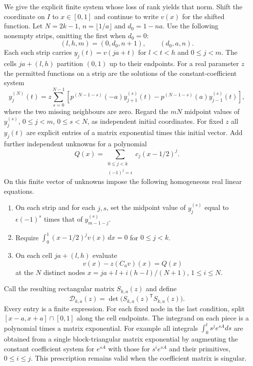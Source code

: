 \documentclass[11pt,a4paper]{article}
\numberwithin{equation}{section}
\begin{document}
We give the explicit finite system whose loss of rank yields that norm. Shift the coordinate on $I$ to $x\in[0,1]$ and continue to write $v(x)$ for the shifted function. Let $N=2k-1$, $n=\lfloor 1/a\rfloor$ and $d_0=1-na$. Use the following nonempty strips, omitting the first when $d_0=0$:
\[
 (l,h,m)=(0,d_0,n+1),\qquad (d_0,a,n).
\]
Each such strip carries $y_j(t)=v(ja+t)$ for $l<t<h$ and $0\le j<m$. The cells $ja+(l,h)$ partition $(0,1)$ up to their endpoints. For a real parameter $z$ the permitted functions on a strip are the solutions of the constant-coefficient system
\begin{equation}
 y_j^{(N)}(t)=z\sum_{s=0}^{N-1}\left[p^{(N-1-s)}(-a)y_{j+1}^{(s)}(t)
       -p^{(N-1-s)}(a)y_{j-1}^{(s)}(t)\right],
 \label{eq:odd-ode}
\end{equation}
where the two missing neighbours are zero. Regard the $mN$ midpoint values of $y_j^{(s)}$, $0\le j<m$, $0\le s<N$, as independent initial coordinates. For fixed $z$ all $y_j(t)$ are explicit entries of a matrix exponential times this initial vector. Add further independent unknowns for a polynomial
\[
 Q(x)=\sum_{\substack{0\le j<k\\(-1)^j=\epsilon}} c_j(x-1/2)^j.
\]
On this finite vector of unknowns impose the following homogeneous real linear equations.
\begin{enumerate}
\item On each strip and for each $j,s$, set the midpoint value of $y_j^{(s)}$ equal to $\epsilon(-1)^s$ times that of $y_{m-1-j}^{(s)}$.
\item Require $\int_0^1(x-1/2)^jv(x)\,dx=0$ for $0\le j<k$.
\item On each cell $ja+(l,h)$ evaluate
\[
       v(x)-z(C_a v)(x)=Q(x)
\]
at the $N$ distinct nodes $x=ja+l+i(h-l)/(N+1)$, $1\le i\le N$.
\end{enumerate}
Call the resulting rectangular matrix $S_{k,a}(z)$ and define
\[
 \mathcal D_{k,a}(z)=\det\bigl(S_{k,a}(z)^{\mathsf T}S_{k,a}(z)\bigr).
\]
Every entry is a finite expression. For each fixed node in the last condition, split $[x-a,x+a]\cap[0,1]$ along the cell endpoints. The integrand on each piece is a polynomial times a matrix exponential. For example all integrals $\int_0^t s^j e^{sA}ds$ are obtained from a single block-triangular matrix exponential by augmenting the constant coefficient system for $e^{sA}$ with those for $s^i e^{sA}$ and their primitives, $0\le i\le j$. This prescription remains valid when the coefficient matrix is singular.
\end{document}
